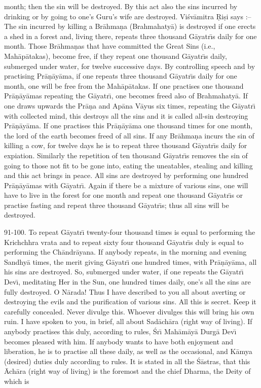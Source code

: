 month; then the sin will be destroyed. By this act also the sins incurred by drinking or by going to one's Guru's wife are destroyed. Vi\'sv\=amitra \d{R}i\d{s}i says :-- The sin incurred by killing a Br\=ahma\d{n}a (Brahmahaty\=a) is destroyed if one erects a shed in a forest and, living there, repeats three thousand G\=ayatr\={\i}s daily for one month. Those Br\=ahma\d{n}as that have committed the Great Sins (i.e., Mah\=ap\=atakas), become free, if they repeat one thousand G\=ayatr\={\i}s daily, submerged under water, for twelve successive days. By controlling speech and by practising Pr\=a\d{n}\=ay\=ama, if one repeats three thousand G\=ayatr\={\i}s daily for one month, one will be free from the Mah\=ap\=atakas. If one practises one thousand Pr\=a\d{n}\=ay\=amas repeating the G\=ayatr\={\i}, one becomes freed also of Brahmahaty\=a. If one draws upwards the Pr\=a\d{n}a and Ap\=ana V\=ayus six times, repeating the G\=ayatr\={\i} with collected mind, this destroys all the sins and it is called all-sin destroying Pr\=a\d{n}\=ay\=ama. If one practises this Pr\=a\d{n}\=ay\=ama one thousand times for one month, the lord of the earth becomes freed of all sins. If any Br\=ahma\d{n}a incurs the sin of killing a cow, for twelve days he is to repeat three thousand G\=ayatr\={\i}s daily for expiation. Similarly the repetition of ten thousand G\=ayatr\={\i}s removes the sin of going to those not fit to be gone into, eating the uneatables, stealing and killing and this act brings in peace. All sins are destroyed by performing one hundred Pr\=a\d{n}\=ay\=amas with G\=ayatr\={\i}. Again if there be a mixture of various sins, one will have to live in the forest for one month and repeat one thousand G\=ayatr\={\i}s or practise fasting and repeat three thousand G\=ayatr\={\i}s; thus all sins will be destroyed.

91-100. To repeat G\=ayatr\={\i} twenty-four thousand times is equal to performing the Krichchhra vrata and to repeat sixty four thousand G\=ayatr\={\i}s duly is equal to performing the Ch\=andr\=ayana. If anybody repeats, in the morning and evening Sandhy\=a times, the merit giving G\=ayatr\={\i} one hundred times, with Pr\=a\d{n}\=ay\=ama, all his sins are destroyed. So, submerged under water, if one repeats the G\=ayatr\={\i} Dev\={\i}, meditating Her in the Sun, one hundred times daily, one's all the sins are fully destroyed. O N\=arada! Thus I have described to you all about averting or destroying the evils and the purification of various sins. All this is secret. Keep it carefully concealed. Never divulge this. Whoever divulges this will bring his own ruin. I have spoken to you, in brief, all about Sad\=ach\=ara (right way of living). If anybody practises this duly, according to rules, \'Sr\={\i} Mah\=am\=ay\=a Durg\=a Dev\={\i} becomes pleased with him. If anybody wants to have both enjoyment and liberation, he is to practise all these daily, as well as the occasional, and K\=amya (desired) duties duly according to rules. It is stated in all the \'S\=astras, that this \=Ach\=ara (right way of living) is the foremost and the chief Dharma, the Deity of which is

